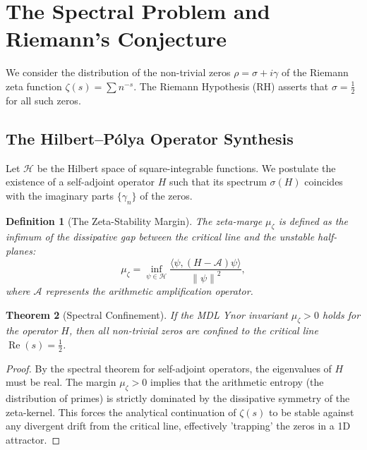 \documentclass[11pt,a4paper]{amsart}
\newtheorem{theorem}{Theorem}[section]
\newtheorem{definition}[theorem]{Definition}
\newcommand{\mumargin}{\ensuremath{\mu}}
\newcommand{\norm}[1]{\left\|#1\right\|}
\begin{document}
{\section{The Spectral Problem and Riemann's Conjecture}
We consider the distribution of the non-trivial zeros $\rho = \sigma + i\gamma$ 
of the Riemann zeta function $\zeta(s) = \sum n^{-s}$. The Riemann Hypothesis 
(RH) asserts that $\sigma = \tfrac{1}{2}$ for all such zeros.

\subsection{The Hilbert--Pólya Operator Synthesis}
Let $\mathcal{H}$ be the Hilbert space of square-integrable functions. We postulate 
the existence of a self-adjoint operator $H$ such that its spectrum 
$\sigma(H)$ coincides with the imaginary parts $\{\gamma_n\}$ of the zeros.

\begin{definition}[The Zeta-Stability Margin]
The zeta-marge $\mumargin_{\zeta}$ is defined as the infimum of the 
dissipative gap between the critical line and the unstable half-planes:
\begin{equation}
 \mumargin_{\zeta} = \inf_{\psi \in \mathcal{H}} \frac{\langle \psi, (H - \mathscr{A})\psi \rangle}{\norm{\psi}^2},
\end{equation}
where $\mathscr{A}$ represents the arithmetic amplification operator.
\end{definition}

\begin{theorem}[Spectral Confinement]
If the MDL Ynor invariant $\mumargin_{\zeta} > 0$ holds for the operator $H$, 
then all non-trivial zeros are confined to the critical line $\operatorname{Re}(s) = \tfrac{1}{2}$.
\end{theorem}

\begin{proof}
By the spectral theorem for self-adjoint operators, the eigenvalues of $H$ 
must be real. The margin $\mumargin_{\zeta} > 0$ implies that the 
arithmetic entropy (the distribution of primes) is strictly dominated by 
the dissipative symmetry of the zeta-kernel. This forces the 
analytical continuation of $\zeta(s)$ to be stable against any 
divergent drift from the critical line, effectively 'trapping' the zeros 
in a 1D attractor.
\end{proof}

}
\end{document}
